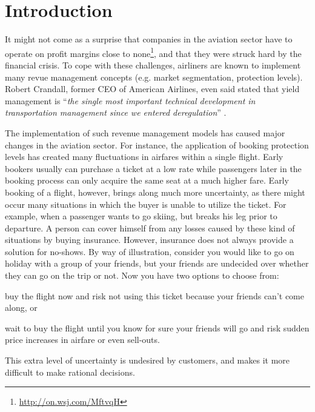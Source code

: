 \chapter{Introduction}
\label{chap:Introduction}

It might not come as a surprise that companies in the aviation sector have to operate on profit margins close to none\footnote{\url{http://on.wsj.com/MftvqH}}, and that they were struck hard by the financial crisis. To cope with these challenges, airliners are known to implement many revue management concepts (e.g. market segmentation, protection levels). Robert Crandall, former CEO of American Airlines, even said stated that yield management is ``\emph{the single most important technical development in transportation management since we entered deregulation}'' \cite[p.~30]{cross97}.

The implementation of such revenue management models has caused major changes in the aviation sector. For instance, the application of booking protection levels has created many fluctuations in airfares within a single flight. Early bookers usually can purchase a ticket at a low rate while passengers later in the booking process can only acquire the same seat at a much higher fare. Early booking of a flight, however, brings along much more uncertainty, as there might occur many situations in which the buyer is unable to utilize the ticket. For example, when a passenger wants to go skiing, but breaks his leg prior to departure. A person can cover himself from any losses caused by these kind of situations by buying insurance. However, insurance does not always provide a solution for no-shows. By way of illustration, consider you would like to go on holiday with a group of your friends, but your friends are undecided over whether they can go on the trip or not. Now you have two options to choose from:
\begin{inparaenum}
    \item buy the flight now and risk not using this ticket because your friends can't come along, or
    \item wait to buy the flight until you know for sure your friends will go and risk sudden price increases in airfare or even sell-outs.
\end{inparaenum}
This extra level of uncertainty is undesired by customers, and makes it more difficult to make rational decisions.

